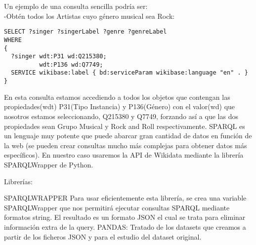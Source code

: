 Un ejemplo de una consulta sencilla podría ser:\\

-Obtén todos los Artistas cuyo género musical sea Rock:\\

\begin{lstlisting}[language=SPARQL]
SELECT ?singer ?singerLabel ?genre ?genreLabel
WHERE
{
  ?singer wdt:P31 wd:Q215380;
      	  wdt:P136 wd:Q7749;
  SERVICE wikibase:label { bd:serviceParam wikibase:language "en" . }
}
\end{lstlisting}

En esta consulta estamos accediendo a todos los objetos que contengan las propiedades(wdt) P31(Tipo Instancia) y P136(Género) con el valor(wd) que nosotros estamos seleccionando, Q215380 y Q7749, forzando así a que las dos propiedades sean Grupo Musical y Rock and Roll respectivamente.
SPARQL es un lenguaje muy potente que puede abarcar gran cantidad de datos en función de la web (se pueden crear consultas mucho más complejas para obtener datos más específicos). En nuestro caso usaremos la API de Wikidata mediante la librería SPARQLWrapper de Python.

Librerías:

SPARQLWRAPPER
Para usar eficientemente esta librería, se crea una variable SPARQLWrapper que nos permitirá ejecutar consultas SPARQL mediante formatos string.
El resultado es un formato JSON el cual se trata para eliminar información extra de la query.
PANDAS:
Tratado de los datasets que creamos a partir de los ficheros JSON y para el estudio del dataset original.